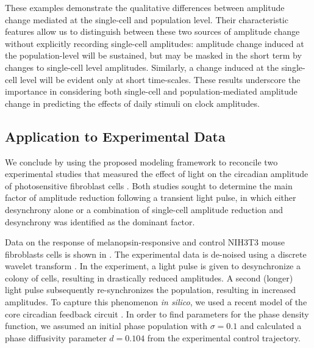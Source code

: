 These examples demonstrate the qualitative differences between amplitude change mediated at the single-cell and population level.
Their characteristic features allow us to distinguish between these two sources of amplitude change without explicitly recording single-cell amplitudes: amplitude change induced at the population-level will be sustained, but may be masked in the short term by changes to single-cell level amplitudes.
Similarly, a change induced at the single-cell level will be evident only at short time-scales.
These results underscore the importance in considering both single-cell and population-mediated amplitude change in predicting the effects of daily stimuli on clock amplitudes.


\subsection{Application to Experimental Data}

We conclude by using the proposed modeling framework to reconcile two experimental studies that measured the effect of light on the circadian amplitude of photosensitive fibroblast cells \cite{Ukai2007, Pulivarthy2007}.
Both studies sought to determine the main factor of amplitude reduction following a transient light pulse, in which either desynchrony alone \cite{Ukai2007} or a combination of single-cell amplitude reduction and desynchrony \cite{Pulivarthy2007} was identified as the dominant factor.

Data on the response of melanopsin-responsive and control NIH3T3 mouse fibroblasts cells is shown in  \cite{Ukai2007}.
The experimental data is de-noised using a discrete wavelet transform \cite{Leise2011}.
In the experiment, a light pulse is given to desynchronize a colony of cells, resulting in drastically reduced amplitudes.
A second (longer) light pulse subsequently re-synchronizes the population, resulting in increased amplitudes.
To capture this phenomenon {\itshape in silico}, we used a recent model of the core circadian feedback circuit \cite{Hirota2012}.
In order to find parameters for the phase density function, we assumed an initial phase population with $\sigma = 0.1$ and calculated a phase diffusivity parameter $d = 0.104$ from the experimental control trajectory.

